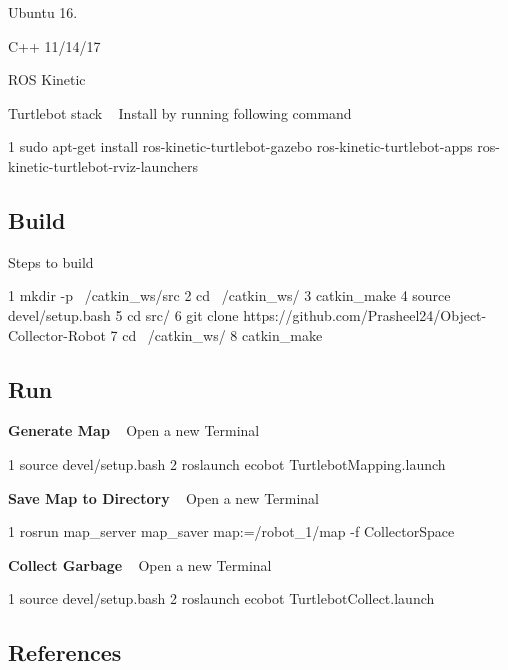 \begin{DoxyEnumerate}
\item Ubuntu 16.
\item C++ 11/14/17
\item R\+OS Kinetic
\item Turtlebot stack ~\newline
 Install by running following command 
\begin{DoxyCode}
1 sudo apt-get install ros-kinetic-turtlebot-gazebo ros-kinetic-turtlebot-apps
       ros-kinetic-turtlebot-rviz-launchers
\end{DoxyCode}

\end{DoxyEnumerate}

\subsection*{Build}

Steps to build 
\begin{DoxyCode}
1 mkdir -p ~/catkin\_ws/src
2 cd ~/catkin\_ws/
3 catkin\_make
4 source devel/setup.bash
5 cd src/
6 git clone https://github.com/Prasheel24/Object-Collector-Robot
7 cd ~/catkin\_ws/
8 catkin\_make
\end{DoxyCode}
 \subsection*{Run}

{\bfseries Generate Map} ~\newline
 Open a new Terminal 
\begin{DoxyCode}
1 source devel/setup.bash
2 roslaunch ecobot TurtlebotMapping.launch
\end{DoxyCode}
 {\bfseries Save Map to Directory} ~\newline
 Open a new Terminal 
\begin{DoxyCode}
1 rosrun map\_server map\_saver map:=/robot\_1/map -f CollectorSpace
\end{DoxyCode}
 {\bfseries Collect Garbage} ~\newline
 Open a new Terminal 
\begin{DoxyCode}
1 source devel/setup.bash
2 roslaunch ecobot TurtlebotCollect.launch
\end{DoxyCode}


\subsection*{References}


